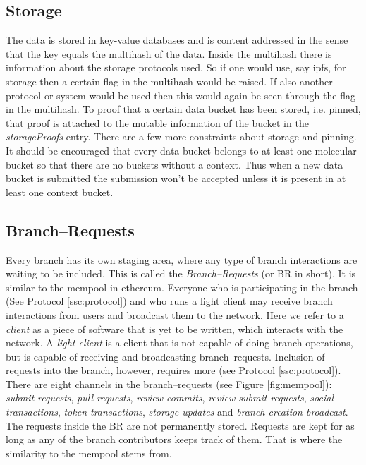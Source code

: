\documentclass[14pt]{article}
\begin{document}
\subsection{Storage}
\label{ssc:storage}

The data is stored in key-value databases and is content addressed in the sense that the key equals the multihash of the data. Inside the multihash there is information about the storage protocols used. So if one would use, say ipfs, for storage then a certain flag in the multihash would be raised. If also another protocol or system would be used then this would again be seen through the flag in the multihash. To proof that a certain data bucket has been stored, i.e. pinned, that proof is attached to the mutable information of the bucket in the \textit{storageProofs} entry. There are a few more constraints about storage and pinning. It should be encouraged that every data bucket belongs to at least one molecular bucket so that there are no buckets without a context. Thus when a new data bucket is submitted the submission won't be accepted unless it is present in at least one context bucket.

\subsection{Branch--Requests}

Every branch has its own staging area, where any type of branch interactions are waiting to be included. This is called the \textit{Branch--Requests} (or BR in short). It is similar to the mempool in ethereum. Everyone who is participating in the branch (See Protocol \ref{ssc:protocol}) and who runs a light client may receive branch interactions from users and broadcast them to the network. Here we refer to a \textit{client} as a piece of software that is yet to be written, which interacts with the network. A \textit{light client} is a client that is not capable of doing branch operations, but is capable of receiving and broadcasting branch--requests. Inclusion of requests into the branch, however, requires more (see Protocol \ref{ssc:protocol}). There are eight channels in the branch--requests (see Figure \ref{fig:mempool}): \textit{submit requests}, \textit{pull requests}, \textit{review commits}, \textit{review submit requests}, \textit{social transactions}, \textit{token transactions}, \textit{storage updates} and \textit{branch creation broadcast}. The requests inside the BR are not permanently stored. Requests are kept for as long as any of the branch contributors keeps track of them. That is where the similarity to the mempool stems from.
\end{document}
